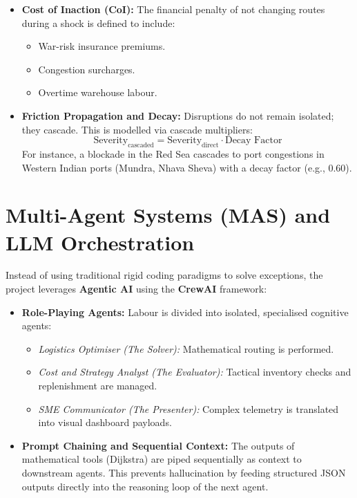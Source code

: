 \begin{itemize}
    \item \textbf{Cost of Inaction (CoI):} The financial penalty of not changing routes during a shock is defined to include:
    \begin{itemize}
        \item War-risk insurance premiums.
        \item Congestion surcharges.
        \item Overtime warehouse labour.
    \end{itemize}
    \item \textbf{Friction Propagation and Decay:} 
    Disruptions do not remain isolated; they cascade. This is modelled via cascade multipliers:
    \begin{equation}
    \text{Severity}_{\text{cascaded}} = \text{Severity}_{\text{direct}} \cdot \text{Decay Factor}
    \end{equation}
    For instance, a blockade in the Red Sea cascades to port congestions in Western Indian ports (Mundra, Nhava Sheva) with a decay factor (e.g., 0.60).
\end{itemize}

\section{Multi-Agent Systems (MAS) and LLM Orchestration}
Instead of using traditional rigid coding paradigms to solve exceptions, the project leverages \textbf{Agentic AI} using the \textbf{CrewAI} framework:

\begin{itemize}
    \item \textbf{Role-Playing Agents:} Labour is divided into isolated, specialised cognitive agents:
    \begin{itemize}
        \item[\textbf{(i)}] \textit{Logistics Optimiser (The Solver):} Mathematical routing is performed.
        \item[\textbf{(ii)}] \textit{Cost and Strategy Analyst (The Evaluator):} Tactical inventory checks and replenishment are managed.
        \item[\textbf{(iii)}] \textit{SME Communicator (The Presenter):} Complex telemetry is translated into visual dashboard payloads.
    \end{itemize}
    \item \textbf{Prompt Chaining and Sequential Context:} The outputs of mathematical tools (Dijkstra) are piped sequentially as context to downstream agents. This prevents hallucination by feeding structured JSON outputs directly into the reasoning loop of the next agent.
\end{itemize}

